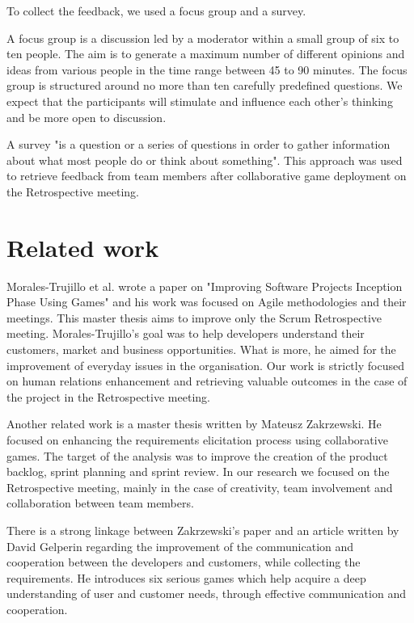 To collect the feedback, we used a focus group and a survey.

A focus group is a discussion led by a moderator within a small group of six to ten people. The aim is to generate a maximum number of different opinions and ideas from various people in the time range between 45 to 90 minutes. The focus group is structured around no more than ten carefully predefined questions. We expect that the participants will stimulate and influence each other's thinking and be more open to discussion\cite{FocusGroupBib}.

A survey "is a question or a series of questions in order to gather information about what most people do or think about something"\cite{Webster}. This approach was used to retrieve feedback from team members after collaborative game deployment on the Retrospective meeting.

\section{Related work}

Morales-Trujillo et al. \cite{MiguelGames} wrote a paper on "Improving Software Projects Inception Phase Using Games" and his work was focused on Agile methodologies and their meetings. This master thesis aims to improve only the Scrum Retrospective meeting. Morales-Trujillo's goal was to help developers understand their customers, market and business opportunities. What is more, he aimed for the improvement of everyday issues in the organisation. Our work is strictly focused on human relations enhancement and retrieving valuable outcomes in the case of the project in the Retrospective meeting. 

Another related work is a master thesis written by Mateusz Zakrzewski\cite{Zakrzewski}. He focused on enhancing the requirements elicitation process using collaborative games. The target of the analysis was to improve the creation of the product backlog, sprint planning and sprint review. In our research we focused on the Retrospective meeting, mainly in the case of creativity, team involvement and collaboration between team members. 

There is a strong linkage between Zakrzewski's paper and an article written by David Gelperin \cite{related2} regarding the improvement of the communication and cooperation between the developers and customers, while collecting the requirements. He introduces six serious games which help acquire a deep understanding of user and customer needs, through effective communication and cooperation.

